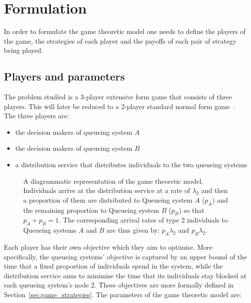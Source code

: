 \section{Formulation}\label{sec:game_formulation}

In order to formulate the game theoretic model one needs to define the players
of the game, the strategies of each player and the payoffs of each pair of
strategy being played.

\subsection{Players and parameters}\label{sec:game_players_and_parameters}

The problem studied is a 3-player extensive form game that consists of three
players.
This will later be reduced to a 2-player standard normal form
game~\cite{Maschler2013}.
The three players are:

\begin{itemize}
    \item the decision makers of queueing system \(A\)
    \item the decision makers of queueing system \(B\)
    \item a distribution service that distributes individuals to the two
    queueing systems
\end{itemize}

\begin{figure}[H]
    \centering
    
    \caption{A diagrammatic representation of the game theoretic model.
    Individuals arrive at the distribution service at a rate of \( \lambda_2 \)
    and then a proportion of them are distributed to Queueing system \(A\)
    (\(p_A\)) and the remaining proportion to Queueing system \(B\) (\(p_B\))
    so that \(p_A + p_B = 1\).
    The corresponding arrival rates of type 2 individuals to Queueing systems
    \(A\) and \(B\) are thus given by:
    \( p_A \lambda_2 \) and \( p_B \lambda_2 \).}
    \label{fig:diagram_of_game_theoretic_model}
\end{figure}

Each player has their own objective which they aim to optimise.
More specifically, the queueing systems' objective is captured by an upper bound
of the time that a fixed proportion of individuals spend in the system,
while the distribution service aims to minimise the time that its individuals
stay blocked at each queueing system's node 2.
These objectives are more formally defined in Section~\ref{sec:game_strategies}.
The parameters of the game theoretic model are:

